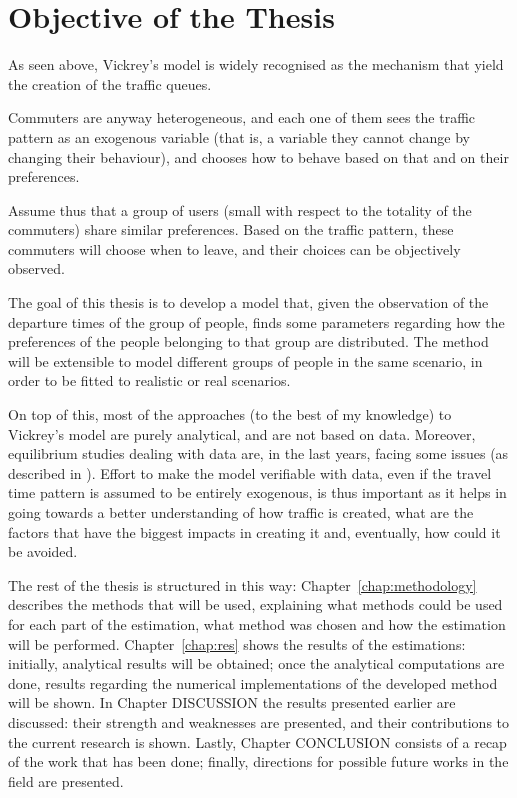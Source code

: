 \section{Objective of the Thesis}
\label{sec:thesis_obj}

As seen above,
Vickrey's model is widely recognised as the mechanism that yield the creation of the traffic queues.

Commuters are anyway heterogeneous,
and each one of them sees the traffic pattern as an exogenous variable
(that is, a variable they cannot change by changing their behaviour),
and chooses how to behave based on that and on their preferences.

Assume thus that a group of users (small with respect to the totality of the commuters) share similar preferences.
Based on the traffic pattern, these commuters will choose when to leave,
and their choices can be objectively observed.

The goal of this thesis is to develop a model that,
given the observation of the departure times of the group of people,
finds some parameters regarding how the preferences of the people belonging to that group are distributed.
The method will be extensible to model different groups of people in the same scenario,
in order to be fitted to realistic or real scenarios.

On top of this, most of the approaches (to the best of my knowledge) to Vickrey's model are purely analytical,
and are not based on data.
Moreover, equilibrium studies dealing with data are, in the last years, facing some issues (as described in \cite{https://doi.org/10.1111/iere.12692}).
Effort to make the model verifiable with data,
even if the travel time pattern is assumed to be entirely exogenous,
is thus important as it helps in going towards a better understanding of how traffic is created,
what are the factors that have the biggest impacts in creating it and, eventually,
how could it be avoided.

The rest of the thesis is structured in this way:
Chapter~\ref{chap:methodology} describes the methods that will be used,
explaining what methods could be used for each part of the estimation,
what method was chosen and how the estimation will be performed.
Chapter~\ref{chap:res} shows the results of the estimations:
initially, analytical results will be obtained;
once the analytical computations are done,
results regarding the numerical implementations of the developed method will be shown.
In Chapter DISCUSSION the results presented earlier are discussed:
their strength and weaknesses are presented,
and their contributions to the current research is shown.
Lastly, Chapter CONCLUSION consists of a recap of the work that has been done;
finally, directions for possible future works in the field are presented.

